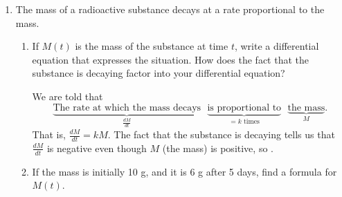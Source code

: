 \documentclass[main]{subfiles}
\begin{document}
\begin{enumerate}[resume]
  







\item 
  The mass of a radioactive substance decays at a rate proportional to the
  mass. 
  \begin{enumerate}
  \item
    \begin{problem}[0.25in]
      If $M(t)$ is the mass of the substance at time $t$, write a
      differential equation that expresses the situation.  How does the
      fact that the substance is decaying factor into your differential
      equation? 
    \end{problem}

    \begin{solution}
      We are told that
      \[ \underbrace{\text{The rate at which the mass
          decays}}_{\frac{dM}{dt}} \text{ } \underbrace{\text{is
          proportional to}}_{= k \text{ times}} \text{ }
      \underbrace{\text{the mass}}_{M}.\] That is, $\boxed{\frac{dM}{dt} =
        kM}$.  The fact that the substance is decaying tells us that
      $\frac{dM}{dt}$ is negative even though $M$ (the mass) is positive,
      so .
    \end{solution}

  \item
    \begin{problem}[\vfill]
      If the mass is initially 10 g, and it is 6 g after 5 days, find a
      formula for $M(t)$.
    \end{problem}


\end{enumerate}
\end{enumerate}
\end{document}
